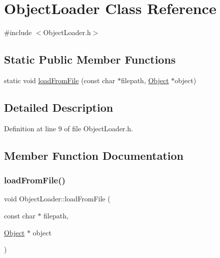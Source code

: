 \hypertarget{class_object_loader}{}\section{Object\+Loader Class Reference}
\label{class_object_loader}


{\ttfamily \#include $<$Object\+Loader.\+h$>$}

\subsection*{Static Public Member Functions}
\begin{DoxyCompactItemize}
\item 
static void \hyperlink{class_object_loader_a1d0581ac5b2ee9e239b68ea6d4875153}{load\+From\+File} (const char $\ast$filepath, \hyperlink{class_object}{Object} $\ast$object)
\end{DoxyCompactItemize}


\subsection{Detailed Description}


Definition at line 9 of file Object\+Loader.\+h.



\subsection{Member Function Documentation}
\mbox{\label{class_object_loader_a1d0581ac5b2ee9e239b68ea6d4875153}} 
\subsubsection{\texorpdfstring{load\+From\+File()}{loadFromFile()}}
{\footnotesize\ttfamily void Object\+Loader\+::load\+From\+File (\begin{DoxyParamCaption}\item[{const char $\ast$}]{filepath,  }\item[{\hyperlink{class_object}{Object} $\ast$}]{object }\end{DoxyParamCaption})\hspace{0.3cm}{\ttfamily [static]}}

